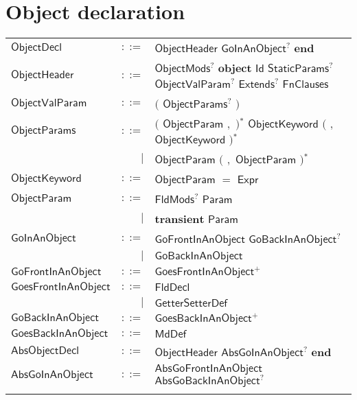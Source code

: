 \section{Object declaration} 

 
\begin{longtable}[l]{p{3cm}rl}
$\mathsf{ObjectDecl}$ &  $\mathsf{::=}$  & $\mathsf{ObjectHeader}$ $\mathsf{GoInAnObject}$$^?$ $\mathbf{end}$ \\
$\mathsf{ObjectHeader}$ &  $\mathsf{::=}$  & $\mathsf{ObjectMods}$$^?$ $\mathbf{object}$ $\mathsf{Id}$ $\mathsf{StaticParams}$$^?$ $\mathsf{ObjectValParam}$$^?$ $\mathsf{Extends}$$^?$ $\mathsf{FnClauses}$ \\
$\mathsf{ObjectValParam}$ &  $\mathsf{::=}$  & $\big($  $\mathsf{ObjectParams}$$^?$ $\big)$ \\
$\mathsf{ObjectParams}$ &  $\mathsf{::=}$  & $\big($  $\mathsf{ObjectParam}$ $\mathbf{,}$ $\big)$$^*$ $\mathsf{ObjectKeyword}$ $\big($  $\mathbf{,}$ $\mathsf{ObjectKeyword}$ $\big)$$^*$ \\
 & $\big|$ &  $\mathsf{ObjectParam}$ $\big($  $\mathbf{,}$ $\mathsf{ObjectParam}$ $\big)$$^*$ \\
$\mathsf{ObjectKeyword}$ &  $\mathsf{::=}$  & $\mathsf{ObjectParam}$ $\mathbf{=}$ $\mathsf{Expr}$ \\
$\mathsf{ObjectParam}$ &  $\mathsf{::=}$  & $\mathsf{FldMods}$$^?$ $\mathsf{Param}$ \\
 & $\big|$ &  $\mathbf{transient}$ $\mathsf{Param}$ \\
$\mathsf{GoInAnObject}$ &  $\mathsf{::=}$  & $\mathsf{GoFrontInAnObject}$ $\mathsf{GoBackInAnObject}$$^?$ \\
 & $\big|$ &  $\mathsf{GoBackInAnObject}$ \\
$\mathsf{GoFrontInAnObject}$ &  $\mathsf{::=}$  & $\mathsf{GoesFrontInAnObject}$$^+$ \\
$\mathsf{GoesFrontInAnObject}$ &  $\mathsf{::=}$  & $\mathsf{FldDecl}$ \\
 & $\big|$ &  $\mathsf{GetterSetterDef}$ \\
$\mathsf{GoBackInAnObject}$ &  $\mathsf{::=}$  & $\mathsf{GoesBackInAnObject}$$^+$ \\
$\mathsf{GoesBackInAnObject}$ &  $\mathsf{::=}$  & $\mathsf{MdDef}$ \\
$\mathsf{AbsObjectDecl}$ &  $\mathsf{::=}$  & $\mathsf{ObjectHeader}$ $\mathsf{AbsGoInAnObject}$$^?$ $\mathbf{end}$ \\
$\mathsf{AbsGoInAnObject}$ &  $\mathsf{::=}$  & $\mathsf{AbsGoFrontInAnObject}$ $\mathsf{AbsGoBackInAnObject}$$^?$ \\
$$
\end{longtable}

